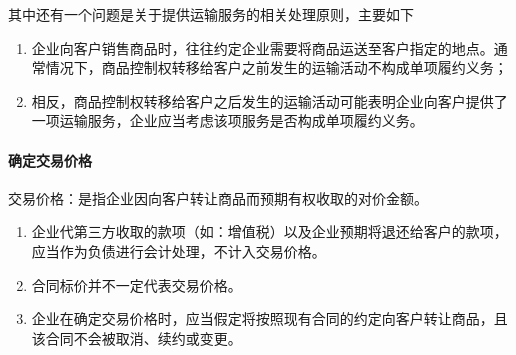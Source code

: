 \documentclass[UTF8,12pt]{ctexart}
\numberwithin{equation}{section} %
\numberwithin{figure}{section}
\numberwithin{table}{section}
\begin{document}
	其中还有一个问题是关于提供运输服务的相关处理原则，主要如下
	\begin{enumerate}
		\item 企业向客户销售商品时，往往约定企业需要将商品运送至客户指定的地点。通常情况下，商品控制权转移给客户之前发生的运输活动不构成单项履约义务；
		
		\item 相反，商品控制权转移给客户之后发生的运输活动可能表明企业向客户提供了一项运输服务，企业应当考虑该项服务是否构成单项履约义务。
	\end{enumerate}
	\paragraph{确定交易价格}
	交易价格：是指企业因向客户转让商品而预期有权收取的对价金额。
	\begin{enumerate}
		\item 企业代第三方收取的款项（如：增值税）以及企业预期将退还给客户的款项，应当作为负债进行会计处理，不计入交易价格。
		
		\item 合同标价并不一定代表交易价格。
		
		\item 企业在确定交易价格时，应当假定将按照现有合同的约定向客户转让商品，且该合同不会被取消、续约或变更。
	\end{enumerate}
	
\end{document}
